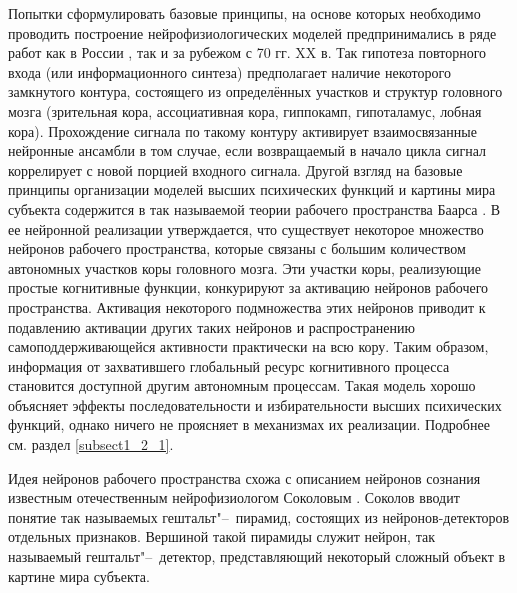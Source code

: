 Попытки сформулировать базовые принципы, на основе которых необходимо проводить построение нейрофизиологических моделей предпринимались в ряде работ как в России \cite{Ivanitsky1996}, так и за рубежом \cite{Edelmen1981} с 70 гг. XX в. Так гипотеза повторного входа (или информационного синтеза) предполагает наличие некоторого замкнутого контура, состоящего из определённых участков и структур головного мозга (зрительная кора, ассоциативная кора, гиппокамп, гипоталамус, лобная кора). Прохождение сигнала по такому контуру активирует взаимосвязанные нейронные ансамбли в том случае, если возвращаемый в начало цикла сигнал коррелирует с новой порцией входного сигнала. Другой взгляд на базовые принципы организации моделей высших психических функций и картины мира субъекта содержится в так называемой теории рабочего пространства Баарса \cite{Baars2005}. В ее нейронной реализации \cite{Dehaene2003} утверждается, что существует некоторое множество нейронов рабочего пространства, которые связаны с большим количеством автономных участков коры головного мозга. Эти участки коры, реализующие простые когнитивные функции, конкурируют за активацию нейронов рабочего пространства. Активация некоторого подмножества этих нейронов приводит к подавлению активации других таких нейронов и распространению самоподдерживающейся активности практически на всю кору. Таким образом, информация от захватившего глобальный ресурс когнитивного процесса становится доступной другим автономным процессам. Такая модель хорошо объясняет эффекты последовательности и избирательности высших психических функций, однако ничего не проясняет в механизмах их реализации. Подробнее см. раздел \ref{subsect1_2_1}.

Идея нейронов рабочего пространства схожа с описанием нейронов сознания известным отечественным нейрофизиологом Соколовым \cite{Sokolov2004}. Соколов вводит понятие так называемых гештальт"--~пирамид, состоящих из нейронов-детекторов отдельных признаков. Вершиной такой пирамиды служит нейрон, так называемый гештальт"--~детектор, представляющий некоторый сложный объект в картине мира субъекта.

